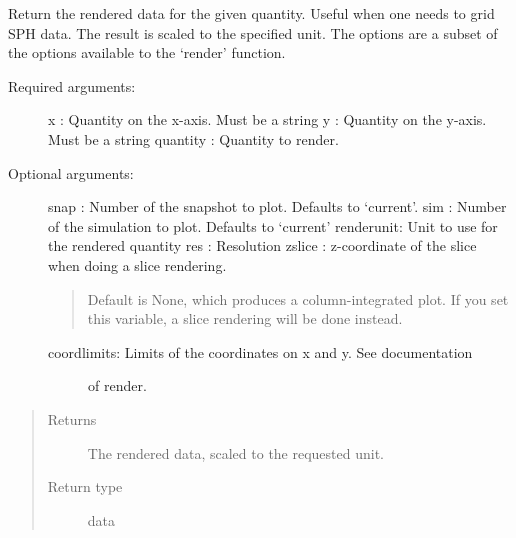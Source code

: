 \documentclass[letterpaper,10pt,english]{sphinxmanual}
\begin{document}
\begin{fulllineitems}
\label{index:facade.get_render_data}
Return the rendered data for the given quantity. Useful when one needs
to grid SPH data. The result is scaled to the specified unit. The options are
a subset of the options available to the `render' function.
\begin{description}
\item[{Required arguments:}] \leavevmode
x        : Quantity on the x-axis. Must be a string
y        : Quantity on the y-axis. Must be a string
quantity : Quantity to render.

\item[{Optional arguments:}] \leavevmode
snap     : Number of the snapshot to plot. Defaults to `current'.
sim      : Number of the simulation to plot. Defaults to `current'
renderunit: Unit to use for the rendered quantity
res      : Resolution
zslice   : z-coordinate of the slice when doing a slice rendering.
\begin{quote}

Default is None, which produces a column-integrated plot.
If you set this variable, a slice rendering will be
done instead.
\end{quote}
\begin{description}
\item[{coordlimits: Limits of the coordinates on x and y. See documentation}] \leavevmode
of render.

\end{description}

\end{description}
\begin{quote}\begin{description}
\item[{Returns}] \leavevmode
The rendered data, scaled to the requested unit.

\item[{Return type}] \leavevmode
data

\end{description}\end{quote}

\end{fulllineitems}

\end{document}
